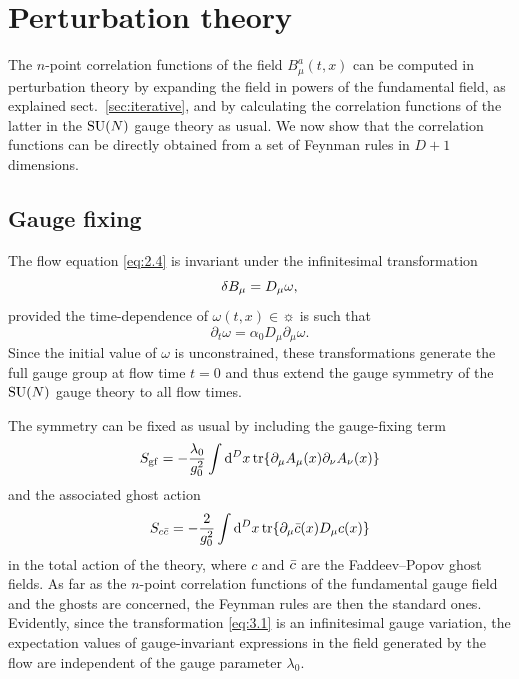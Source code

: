 \section{Perturbation theory}\label{sec:perturbation}

The $n$-point
correlation functions of the field $B^a_{\mu}(t,x)$
can be computed in perturbation theory by expanding the
field in powers of the fundamental field, as explained sect.~\ref{sec:iterative},
and by calculating the correlation functions of the latter
in the $\mathrm{SU}(N)$ gauge theory as usual.
We now show that the correlation functions can be
directly obtained from
a set of Feynman rules in $D+1$ dimensions.

\subsection{Gauge fixing}\label{ssec:gaugefixing}

The flow equation \eqref{eq:2.4}
is invariant under the infinitesimal transformation
\begin{equation}
  \delta B_{\mu}=D_{\mu}\omega,
  \label{eq:3.1}
\end{equation}
provided the time-dependence of $\omega(t,x)\in\sun$
is such that
\begin{equation}
  \partial_t\omega=\alpha_0D_{\mu}\partial_{\mu}\omega.
  \label{eq:3.2}
\end{equation}
Since the initial value of $\omega$ is unconstrained, these transformations
generate the full gauge group at flow time $t=0$ and thus extend the
gauge symmetry of the $\mathrm{SU}(N)$ gauge theory to all flow times.

The symmetry can be fixed as usual by including the
gauge-fixing term
\begin{equation}
  S_{\mathrm{gf}}=-{\lambda_0\over g_0^2}\int\mathrm{d}^Dx\,
  \mathrm{tr}\{\partial_{\mu}A_{\mu}(x)\partial_{\nu}A_{\nu}(x)\}
  \label{eq:3.3}
\end{equation}
and the associated ghost action
\begin{equation}
  S_{c\bar{c}}=-{2\over g_0^2}\int\mathrm{d}^Dx\,
  \mathrm{tr}\{\partial_{\mu}\bar{c}(x)D_{\mu}c(x)\}
  \label{eq:3.4}
\end{equation}
in the total action of the theory, where $c$ and $\bar{c}$ are the
Faddeev--Popov ghost fields.
As far as the $n$-point
correlation functions of the fundamental gauge field
and the ghosts are concerned, the Feynman rules are then the standard
ones. Evidently, since the transformation \eqref{eq:3.1} is
an infinitesimal gauge variation, the expectation values of
gauge-invariant expressions in the field generated by the flow
are independent of the gauge parameter $\lambda_0$.

